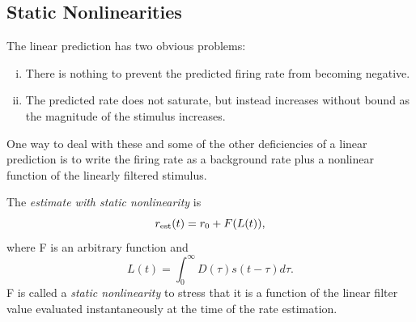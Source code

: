 \subsection{Static Nonlinearities}
\begin{rem}
  The linear prediction has two obvious problems:
  \begin{enumerate}[(i)]
  \item There is nothing to prevent the predicted firing rate from becoming negative.
  \item The predicted rate does not saturate, but instead increases without bound as the magnitude of the stimulus increases.
  \end{enumerate}
  One way to deal with these and some of the other deficiencies of a linear prediction is to write the firing rate as a background rate plus a nonlinear function of the linearly filtered stimulus.
\end{rem}

\begin{defn}
  \label{def:staticNonlinearity}
  The \emph{estimate with static nonlinearity} is
  \begin{equation}
    \label{equ:2.8}
    r_{\rm{est}}(t) = r_0 + F(L(t)),
  \end{equation}
  where F is an arbitrary function and
  \begin{equation}
    \label{equ:2.7}
    L(t) = \int_0^{\infty}D(\tau)s(t-\tau)d\tau.
  \end{equation}
  F is called a \emph{static nonlinearity} to stress that it is a function of the linear filter value evaluated instantaneously at the time of the rate estimation.
\end{defn}

